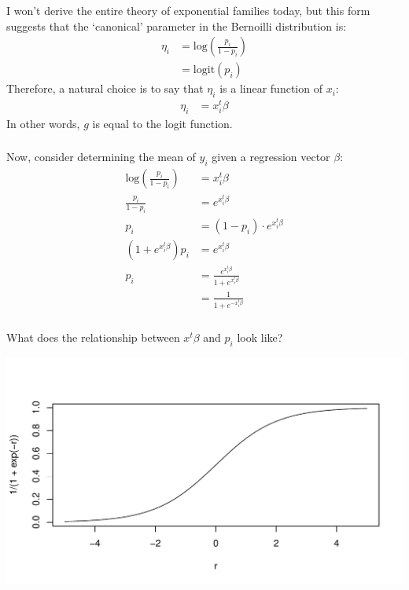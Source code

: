 \begin{frame}[fragile] \frametitle{}

I won't derive the entire theory of exponential families today, but this form
suggests that the `canonical' parameter in the Bernoilli distribution is:
\begin{align*}
\eta_i &= \text{log} \left( \frac{p_i}{1 - p_i} \right) \\
&= \text{logit} (p_i)
\end{align*}
\pause Therefore, a natural choice is to say that $\eta_i$ is a linear function
of $x_i$:
\begin{align*}
\eta_i &= x_i^t \beta
\end{align*}
In other words, $g$ is equal to the logit function.

\end{frame}

\begin{frame}[fragile] \frametitle{}

Now, consider determining the mean of $y_i$ given a regression
vector $\beta$:
\begin{align*}
\text{log} \left( \frac{p_i}{1 - p_i} \right) &= x_i^t \beta \\
\frac{p_i}{1 - p_i} &= e^{x_i^t \beta} \\
p_i &= (1 - p_i) \cdot e^{x_i^t \beta} \\
\left( 1 + e^{x_i^t \beta} \right) p_i &= e^{x_i^t \beta} \\
p_i &= \frac{e^{x_i^t \beta}}{1 + e^{x_i^t \beta}} \\
&= \frac{1}{1 + e^{-x_i^t \beta}}
\end{align*}

\end{frame}

\begin{frame}[fragile] \frametitle{}

What does the relationship between $x^t \beta$ and $p_i$ look like?

\begin{center}
\includegraphics[width=\textwidth]{img/fig01.pdf}
\end{center}

\end{frame}

